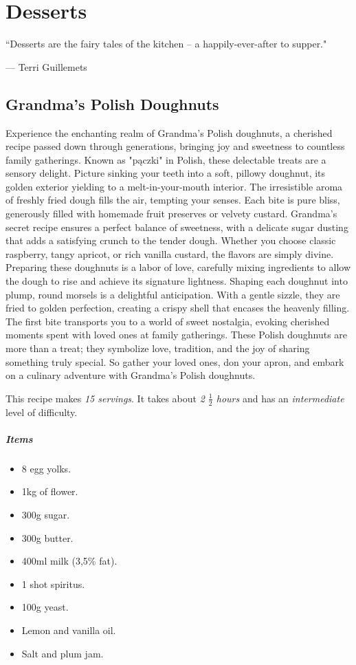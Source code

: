 \chapter{Desserts}
\label{desserts}
\epigraph{``Desserts are the fairy tales of the kitchen -- a happily-ever-after to supper."}{--- \textup{Terri Guillemets}}

\section{Grandma's Polish Doughnuts}
\label{grandmaspolishdoughnuts}
Experience the enchanting realm of Grandma's Polish doughnuts, a cherished recipe passed down through generations, bringing joy and sweetness to countless family gatherings. Known as "pączki" in Polish, these delectable treats are a sensory delight. Picture sinking your teeth into a soft, pillowy doughnut, its golden exterior yielding to a melt-in-your-mouth interior. The irresistible aroma of freshly fried dough fills the air, tempting your senses. Each bite is pure bliss, generously filled with homemade fruit preserves or velvety custard. Grandma's secret recipe ensures a perfect balance of sweetness, with a delicate sugar dusting that adds a satisfying crunch to the tender dough. Whether you choose classic raspberry, tangy apricot, or rich vanilla custard, the flavors are simply divine. Preparing these doughnuts is a labor of love, carefully mixing ingredients to allow the dough to rise and achieve its signature lightness. Shaping each doughnut into plump, round morsels is a delightful anticipation. With a gentle sizzle, they are fried to golden perfection, creating a crispy shell that encases the heavenly filling. The first bite transports you to a world of sweet nostalgia, evoking cherished moments spent with loved ones at family gatherings. These Polish doughnuts are more than a treat; they symbolize love, tradition, and the joy of sharing something truly special. So gather your loved ones, don your apron, and embark on a culinary adventure with Grandma's Polish doughnuts.

This recipe makes \emph{15 servings}. It takes about \emph{2 $\frac{1}{2}$ hours} and has an \emph{intermediate} level of difficulty. 

\paragraph{Items}
\begin{itemize}[noitemsep]
    \item[\ding{182}] 8 egg yolks.
    \item[\ding{183}] 1kg of flower.
    \item[\ding{184}] 300g sugar.
    \item[\ding{185}] 300g butter.
    \item[\ding{186}] 400ml milk (3,5\% fat).
    \item[\ding{187}] 1 shot spiritus.
    \item[\ding{188}] 100g yeast.
    \item[\ding{189}] Lemon and vanilla oil.
    \item[\ding{190}] Salt and plum jam.
\end{itemize}

